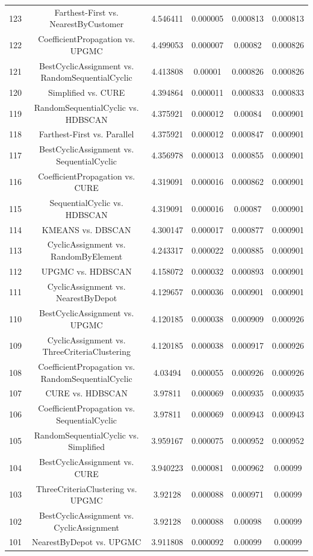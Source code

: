 \documentclass[a4paper,10pt]{article}
\begin{document}
\begin{landscape}
\begin{table}[!htp]
\begin{tabular}{cccccc}
123&Farthest-First vs. NearestByCustomer&4.546411&0.000005&0.000813&0.000813\\
122&CoefficientPropagation vs. UPGMC&4.499053&0.000007&0.00082&0.000826\\
121&BestCyclicAssignment vs. RandomSequentialCyclic&4.413808&0.00001&0.000826&0.000826\\
120&Simplified vs. CURE&4.394864&0.000011&0.000833&0.000833\\
119&RandomSequentialCyclic vs. HDBSCAN&4.375921&0.000012&0.00084&0.000901\\
118&Farthest-First vs. Parallel&4.375921&0.000012&0.000847&0.000901\\
117&BestCyclicAssignment vs. SequentialCyclic&4.356978&0.000013&0.000855&0.000901\\
116&CoefficientPropagation vs. CURE&4.319091&0.000016&0.000862&0.000901\\
115&SequentialCyclic vs. HDBSCAN&4.319091&0.000016&0.00087&0.000901\\
114&KMEANS vs. DBSCAN&4.300147&0.000017&0.000877&0.000901\\
113&CyclicAssignment vs. RandomByElement&4.243317&0.000022&0.000885&0.000901\\
112&UPGMC vs. HDBSCAN&4.158072&0.000032&0.000893&0.000901\\
111&CyclicAssignment vs. NearestByDepot&4.129657&0.000036&0.000901&0.000901\\
110&BestCyclicAssignment vs. UPGMC&4.120185&0.000038&0.000909&0.000926\\
109&CyclicAssignment vs. ThreeCriteriaClustering&4.120185&0.000038&0.000917&0.000926\\
108&CoefficientPropagation vs. RandomSequentialCyclic&4.03494&0.000055&0.000926&0.000926\\
107&CURE vs. HDBSCAN&3.97811&0.000069&0.000935&0.000935\\
106&CoefficientPropagation vs. SequentialCyclic&3.97811&0.000069&0.000943&0.000943\\
105&RandomSequentialCyclic vs. Simplified&3.959167&0.000075&0.000952&0.000952\\
104&BestCyclicAssignment vs. CURE&3.940223&0.000081&0.000962&0.00099\\
103&ThreeCriteriaClustering vs. UPGMC&3.92128&0.000088&0.000971&0.00099\\
102&BestCyclicAssignment vs. CyclicAssignment&3.92128&0.000088&0.00098&0.00099\\
101&NearestByDepot vs. UPGMC&3.911808&0.000092&0.00099&0.00099\\

\end{tabular}
\end{table}
\end{landscape}
\end{document}
